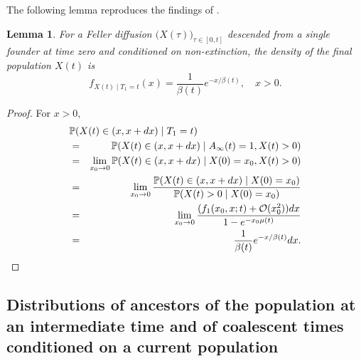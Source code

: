 \documentclass[preprint,12pt]{elsarticle}
\newtheorem{lemma}{Lemma}
\begin{document}
The following lemma reproduces the findings of \citet[Theorem~2.1]{o1995genealogy}.
\begin{lemma} \label{lemma:OConnell}
For a Feller diffusion $\big(X(\tau)\big)_{\tau \in [0, t]}$ descended from a single founder at time zero and conditioned on non-extinction, the density of 
the final population $X(t)$ is
\begin{equation}	\label{expFromSingleAncestor}
f_{X(t)\mid T_1 = t}(x) = \frac{1}{\beta(t)} e^{-x/\beta(t)}, \quad x > 0.  
\end{equation}
\end{lemma}
%
\begin{proof}
For $x > 0$, 
\begin{eqnarray*}
\lefteqn{\mathbb{P}(X(t) \in (x, x + dx) \mid T_1 = t)} \nonumber \\
	& = & \mathbb{P}(X(t) \in (x, x + dx) \mid A_\infty(t) = 1, X(t) > 0) \nonumber \\
	& = & \lim_{x_0 \to 0} \mathbb{P}(X(t) \in (x, x + dx) \mid X(0) = x_0, X(t) > 0) \nonumber \\
	& = & \lim_{x_0 \to 0} \frac{\mathbb{P}(X(t) \in (x, x + dx) \mid X(0) = x_0)}{\mathbb{P}(X(t) > 0 \mid X(0) = x_0)} \nonumber \\
	& = & \lim_{x_0 \to 0} \frac{(f_1(x_0, x; t) + \mathcal{O}(x_0^2)) dx}{1 - e^{-x_0 \mu(t)}} \nonumber \\
	& = & \frac{1}{\beta(t)} e^{-x/\beta(t)} dx.  
\end{eqnarray*}
\end{proof}

%
%
\subsection{Distributions of ancestors of the population at an intermediate time and of coalescent times conditioned on a current population}
\label{sec:IntermediateAncestors}
\end{document}
